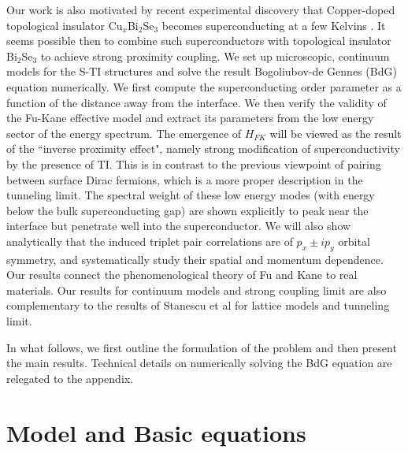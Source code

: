 \documentclass[12pt,twocolumn]{article}
\begin{document}
Our work is also motivated by recent experimental discovery that Copper-doped 
topological insulator Cu$_x$Bi$_2$Se$_3$
becomes superconducting at a few Kelvins \cite{cu1,cu2,ando}. It 
seems possible then to combine such superconductors with topological insulator 
Bi$_2$Se$_3$ to achieve strong proximity coupling. 
We set up microscopic, continuum models for the S-TI structures and solve the result 
Bogoliubov-de Gennes (BdG) equation numerically.
We first compute the superconducting order 
parameter as a function of the distance
away from the interface.
We then verify the validity of the Fu-Kane effective model
and extract its parameters from the low energy sector of the energy
spectrum. The emergence
of $H_{FK}$ will be viewed as the result of the ``inverse proximity effect", namely
strong modification of superconductivity by the presence of TI.
This is in contrast to the previous viewpoint of
pairing between surface Dirac fermions, which is a more proper description
in the tunneling limit.
The spectral weight of these low energy modes (with energy below the bulk superconducting gap) 
are shown explicitly to peak near the interface but penetrate well
into the superconductor.
We will also show analytically that the induced triplet pair
correlations are of $p_x\pm ip_y$ orbital symmetry, and systematically
study their spatial and momentum dependence.
Our results connect the phenomenological theory of Fu and Kane \cite{f-k}
to real materials. Our results for continuum models and strong coupling 
limit are also complementary to the results of Stanescu et al \cite{stan}
for lattice models and tunneling limit.

In what follows, we first outline the formulation of the problem and 
then present the main results. Technical details on numerically solving
the BdG equation are relegated to the appendix.

\section{Model and Basic equations}
\end{document}
